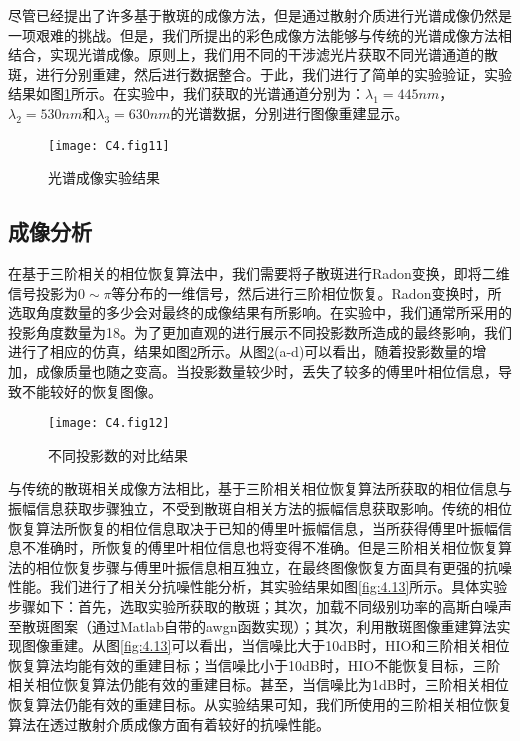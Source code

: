 尽管已经提出了许多基于散斑的成像方法，但是通过散射介质进行光谱成像仍然是一项艰难的挑战。但是，我们所提出的彩色成像方法能够与传统的光谱成像方法相结合，实现光谱成像。原则上，我们用不同的干涉滤光片获取不同光谱通道的散斑，进行分别重建，然后进行数据整合。于此，我们进行了简单的实验验证，实验结果如图\ref{fig:4.11}所示。在实验中，我们获取的光谱通道分别为：$\lambda_1 =445nm$，$\lambda_2  =530nm$和$\lambda_3  =630nm$的光谱数据，分别进行图像重建显示。

\begin{figure}[htp]
	\centering
	\texttt{[image: C4.fig11]}
	\caption{光谱成像实验结果}
	\label{fig:4.11}
\end{figure}

\subsection{成像分析}

在基于三阶相关的相位恢复算法中，我们需要将子散斑进行Radon变换，即将二维信号投影为$0\sim \pi$等分布的一维信号，然后进行三阶相位恢复。Radon变换时，所选取角度数量的多少会对最终的成像结果有所影响。在实验中，我们通常所采用的投影角度数量为18。为了更加直观的进行展示不同投影数所造成的最终影响，我们进行了相应的仿真，结果如图\ref{fig:4.12}所示。从图\ref{fig:4.12}(a-d)可以看出，随着投影数量的增加，成像质量也随之变高。当投影数量较少时，丢失了较多的傅里叶相位信息，导致不能较好的恢复图像。

\begin{figure}[htp]
	\centering
	\texttt{[image: C4.fig12]}
	\caption{不同投影数的对比结果}
	\label{fig:4.12}
\end{figure}

与传统的散斑相关成像方法相比，基于三阶相关相位恢复算法所获取的相位信息与振幅信息获取步骤独立，不受到散斑自相关方法的振幅信息获取影响。传统的相位恢复算法所恢复的相位信息取决于已知的傅里叶振幅信息，当所获得傅里叶振幅信息不准确时，所恢复的傅里叶相位信息也将变得不准确。但是三阶相关相位恢复算法的相位恢复步骤与傅里叶振信息相互独立，在最终图像恢复方面具有更强的抗噪性能。我们进行了相关分抗噪性能分析，其实验结果如图\ref{fig:4.13}所示。具体实验步骤如下：首先，选取实验所获取的散斑；其次，加载不同级别功率的高斯白噪声至散斑图案（通过Matlab自带的awgn函数实现）；其次，利用散斑图像重建算法实现图像重建。从图\ref{fig:4.13}可以看出，当信噪比大于10dB时，HIO和三阶相关相位恢复算法均能有效的重建目标；当信噪比小于10dB时，HIO不能恢复目标，三阶相关相位恢复算法仍能有效的重建目标。甚至，当信噪比为1dB时，三阶相关相位恢复算法仍能有效的重建目标。从实验结果可知，我们所使用的三阶相关相位恢复算法在透过散射介质成像方面有着较好的抗噪性能。

